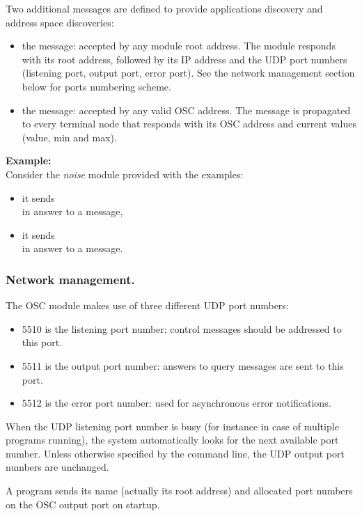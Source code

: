 Two additional messages are defined to provide \faust applications discovery and address space discoveries:
\begin{itemize}
\item the  message: accepted by any module root address. The module responds with its root address, followed by its IP address and the UDP port numbers (listening port, output port, error port).
See the network management section below for ports numbering scheme.
\item the  message: accepted by any valid OSC address. The  message is propagated to every terminal node that responds with its OSC address and current values (value, min and max).
\end{itemize}

\textbf{Example:} \\
Consider the \emph{noise} module provided with the \faust examples:
\begin{itemize}
\item it sends  \\in answer to a  message,
\item it sends  \\in answer to a  message.
\end{itemize}

 
\subsubsection{Network management.}
The OSC module makes use of three different UDP port numbers:
\begin{itemize}
\item 5510 is the listening port number: control messages should be addressed to this port.
\item 5511 is the output port number: answers to query messages are sent to this port.
\item 5512 is the error port number: used for asynchronous error notifications.
\end{itemize}

When the UDP listening port number is busy (for instance in case of multiple \faust programs running), the system automatically looks for the next available port number. Unless otherwise specified by the command line, the UDP output port numbers are unchanged. 

A program sends its name (actually its root address) and allocated port numbers on the OSC output port on startup.

